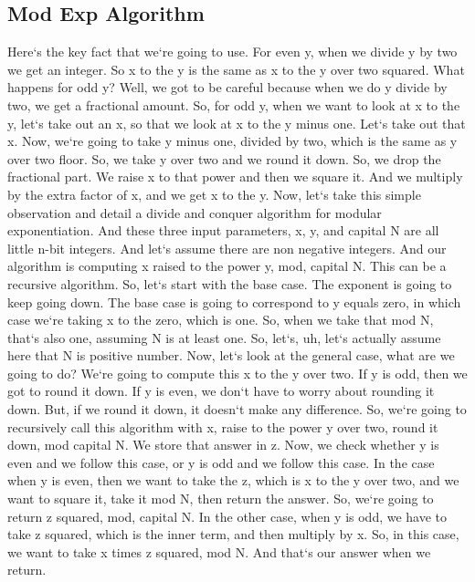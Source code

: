 \subsection{Mod Exp Algorithm}
Here`s the key fact that we`re going to use.
For even y, when we divide y by two we get an integer.
So x to the y is the same as x to the y over two squared.
What happens for odd y? Well, we got to be careful because when we do y divide by two, we get a fractional amount.
So, for odd y, when we want to look at x to the y, let`s take out an x, so that we look at x to the y minus one.
Let`s take out that x.
Now, we`re going to take y minus one, divided by two, which is the same as y over two floor.
So, we take y over two and we round it down.
So, we drop the fractional part.
We raise x to that power and then we square it.
And we multiply by the extra factor of x, and we get x to the y.
Now, let`s take this simple observation and detail a divide and conquer algorithm for modular exponentiation.
And these three input parameters, x, y, and capital N are all little n-bit integers.
And let`s assume there are non negative integers.
And our algorithm is computing x raised to the power y, mod, capital N\@.
This can be a recursive algorithm.
So, let`s start with the base case.
The exponent is going to keep going down.
The base case is going to correspond to y equals zero, in which case we`re taking x to the zero, which is one.
So, when we take that mod N, that`s also one, assuming N is at least one.
So, let`s, uh, let`s actually assume here that N is positive number.
Now, let`s look at the general case, what are we going to do? We`re going to compute this x to the y over two.
If y is odd, then we got to round it down.
If y is even, we don`t have to worry about rounding it down.
But, if we round it down, it doesn`t make any difference.
So, we`re going to recursively call this algorithm with x, raise to the power y over two, round it down, mod capital N\@.
We store that answer in z.
Now, we check whether y is even and we follow this case, or y is odd and we follow this case.
In the case when y is even, then we want to take the z, which is x to the y over two, and we want to square it, take it mod N, then return the answer.
So, we`re going to return z squared, mod, capital N\@.
In the other case, when y is odd, we have to take z squared, which is the inner term, and then multiply by x.
So, in this case, we want to take x times z squared, mod N\@.
And that`s our answer when we return.

